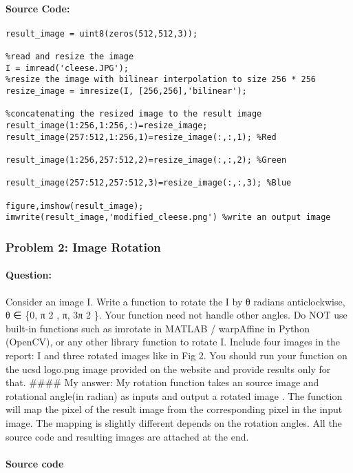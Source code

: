 \documentclass[]{article}
\let\oldparagraph\paragraph
\renewcommand{\paragraph}[1]{\oldparagraph{#1}\mbox{}}
\begin{document}
\paragraph{Source Code:}\label{source-code}

\begin{verbatim}
result_image = uint8(zeros(512,512,3));

%read and resize the image
I = imread('cleese.JPG');
%resize the image with bilinear interpolation to size 256 * 256
resize_image = imresize(I, [256,256],'bilinear');

%concatenating the resized image to the result image
result_image(1:256,1:256,:)=resize_image;
result_image(257:512,1:256,1)=resize_image(:,:,1); %Red

result_image(1:256,257:512,2)=resize_image(:,:,2); %Green

result_image(257:512,257:512,3)=resize_image(:,:,3); %Blue

figure,imshow(result_image);
imwrite(result_image,'modified_cleese.png') %write an output image
\end{verbatim}

\subsubsection{Problem 2: Image
Rotation}\label{problem-2-image-rotation}

\paragraph{Question:}\label{question}

Consider an image I. Write a function to rotate the I by θ radians
anticlockwise, θ ∈ \{0, π 2 , π, 3π 2 \}. Your function need not handle
other angles. Do NOT use built-in functions such as imrotate in MATLAB /
warpAﬃne in Python (OpenCV), or any other library function to rotate I.
Include four images in the report: I and three rotated images like in
Fig 2. You should run your function on the ucsd logo.png image provided
on the website and provide results only for that. \#\#\#\# My answer: My
rotation function takes an source image and rotational angle(in radian)
as inputs and output a rotated image . The function will map the pixel
of the result image from the corresponding pixel in the input image. The
mapping is slightly different depends on the rotation angles. All the
source code and resulting images are attached at the end.

\paragraph{Source code}\label{source-code-1}
\end{document}
